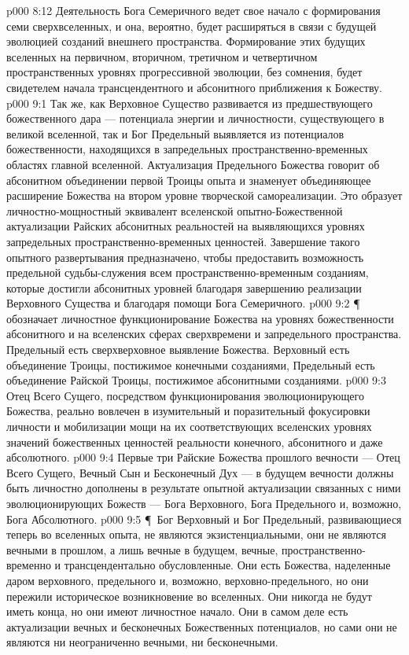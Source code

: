 \vs p000 8:12 Деятельность Бога Семеричного ведет свое начало с формирования семи сверхвселенных, и она, вероятно, будет расширяться в связи с будущей эволюцией созданий внешнего пространства. Формирование этих будущих вселенных на первичном, вторичном, третичном и четвертичном пространственных уровнях прогрессивной эволюции, без сомнения, будет свидетелем начала трансцендентного и абсонитного приближения к Божеству.
\vs p000 9:1 Так же, как Верховное Существо развивается из предшествующего божественного дара --- потенциала энергии и личностности, существующего в великой вселенной, так и Бог Предельный выявляется из потенциалов божественности, находящихся в запредельных пространственно\hyp{}временных областях главной вселенной. Актуализация Предельного Божества говорит об абсонитном объединении первой Троицы опыта и знаменует объединяющее расширение Божества на втором уровне творческой самореализации. Это образует личностно\hyp{}мощностный эквивалент вселенской опытно\hyp{}Божественной актуализации Райских абсонитных реальностей на выявляющихся уровнях запредельных пространственно\hyp{}временных ценностей. Завершение такого опытного развертывания предназначено, чтобы предоставить возможность предельной судьбы\hyp{}служения всем пространственно\hyp{}временным созданиям, которые достигли абсонитных уровней благодаря завершению реализации Верховного Существа и благодаря помощи Бога Семеричного.
\vs p000 9:2 \P\  обозначает личностное функционирование Божества на уровнях божественности абсонитного и на вселенских сферах сверхвремени и запредельного пространства. Предельный есть сверхверховное выявление Божества. Верховный есть объединение Троицы, постижимое конечными созданиями, Предельный есть объединение Райской Троицы, постижимое абсонитными созданиями.
\vs p000 9:3 Отец Всего Сущего, посредством функционирования эволюционирующего Божества, реально вовлечен в изумительный и поразительный  фокусировки личности и мобилизации мощи на их соответствующих вселенских уровнях значений божественных ценностей реальности конечного, абсонитного и даже абсолютного.
\vs p000 9:4 Первые три Райские Божества прошлого вечности --- Отец Всего Сущего, Вечный Сын и Бесконечный Дух --- в будущем вечности должны быть личностно дополнены в результате опытной актуализации связанных с ними эволюционирующих Божеств --- Бога Верховного, Бога Предельного и, возможно, Бога Абсолютного.
\vs p000 9:5 \P\ Бог Верховный и Бог Предельный, развивающиеся теперь во вселенных опыта, не являются экзистенциальными, они не являются вечными в прошлом, а лишь вечные в будущем, вечные, пространственно\hyp{}временно и трансцендентально обусловленные. Они есть Божества, наделенные даром верховного, предельного и, возможно, верховно\hyp{}предельного, но они пережили историческое возникновение во вселенных. Они никогда не будут иметь конца, но они имеют личностное начало. Они в самом деле есть актуализации вечных и бесконечных Божественных потенциалов, но сами они не являются ни неограниченно вечными, ни бесконечными.
